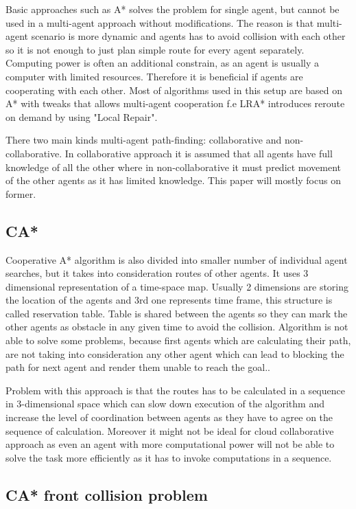 Basic approaches such as A* solves the problem for single agent, but cannot be used in a multi-agent approach without modifications. The reason is that multi-agent scenario is more dynamic and agents has to avoid collision with each other so it is not enough to just plan simple route for every agent separately. Computing power is often an additional constrain, as an agent is usually a computer with limited resources. Therefore it is beneficial if agents are cooperating with each other. Most of algorithms used in this setup are based on A* with tweaks that allows multi-agent cooperation f.e LRA* introduces reroute on demand by using "Local Repair"\cite{path_adv}.

There two main kinds multi-agent path-finding: collaborative and non-collaborative. In collaborative approach it is assumed that all agents have full knowledge of all the other where in non-collaborative it must predict movement of the other agents as it has limited knowledge. This paper will mostly focus on former.
\subsection{CA*}
Cooperative A* algorithm is also divided into smaller number of individual agent searches, but it takes into consideration routes of other agents. It uses 3 dimensional representation of a time-space map. Usually 2 dimensions are storing the location of the agents and 3rd one represents time frame, this structure is called reservation table. Table is shared between the agents so they can mark the other agents as obstacle in any given time to avoid the collision. Algorithm is not able to solve some problems, because first agents which are calculating their path, are not taking into consideration any other agent which can lead to blocking the path for next agent and render them unable to reach the goal.\cite{path_adv}. 

Problem with this approach is that the routes has to be calculated in a sequence in 3-dimensional space which can slow down execution of the algorithm and increase the level of coordination between agents as they have to agree on the sequence of calculation. Moreover it might not be ideal for cloud collaborative approach as even an agent with more computational power will not be able to solve the task more efficiently as it has to invoke computations in a sequence.

\subsection{CA* front collision problem}
